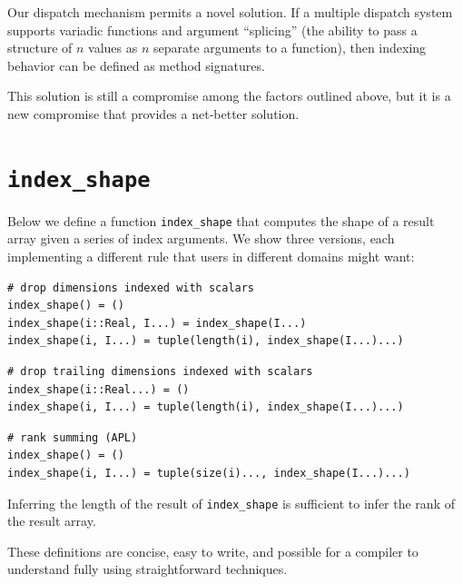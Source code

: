 \documentclass[preprint]{sigplanconf}
\begin{document}

Our dispatch mechanism permits a novel solution. If a multiple dispatch system
supports variadic functions and argument ``splicing'' (the ability to pass a
structure of $n$ values as $n$ separate arguments to a function), then
indexing behavior can be defined as method signatures.

This solution is still a compromise among the factors outlined above, but it
is a new compromise that provides a net-better solution.


\section{\texttt{index\_shape}}

Below we define a function \texttt{index\_shape} that computes the shape of a
result array given a series of index arguments. We show three versions, each
implementing a different rule that users in different domains might want:


\begin{verbatim}
# drop dimensions indexed with scalars
index_shape() = ()
index_shape(i::Real, I...) = index_shape(I...)
index_shape(i, I...) = tuple(length(i), index_shape(I...)...)
\end{verbatim}

\begin{verbatim}
# drop trailing dimensions indexed with scalars
index_shape(i::Real...) = ()
index_shape(i, I...) = tuple(length(i), index_shape(I...)...)
\end{verbatim}

\begin{verbatim}
# rank summing (APL)
index_shape() = ()
index_shape(i, I...) = tuple(size(i)..., index_shape(I...)...)
\end{verbatim}

Inferring the length of the result of \texttt{index\_shape} is sufficient to
infer the rank of the result array.

These definitions are concise, easy to write, and possible for a compiler to
understand fully using straightforward techniques.

\end{document}
